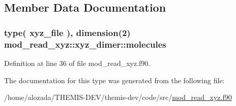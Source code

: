 \subsection{Member Data Documentation}
\subsubsection[{\texorpdfstring{molecules}{molecules}}]{\setlength{\rightskip}{0pt plus 5cm}type( {\bf xyz\+\_\+file} ), dimension(2) mod\+\_\+read\+\_\+xyz\+::xyz\+\_\+dimer\+::molecules}\hypertarget{structmod__read__xyz_1_1xyz__dimer_af7e03e5b57bc4a39e4905ff0aecbf6b6}{}\label{structmod__read__xyz_1_1xyz__dimer_af7e03e5b57bc4a39e4905ff0aecbf6b6}


Definition at line 36 of file mod\+\_\+read\+\_\+xyz.\+f90.



The documentation for this type was generated from the following file\+:\begin{DoxyCompactItemize}
\item 
/home/alozada/\+T\+H\+E\+M\+I\+S-\/\+D\+E\+V/themis-\/dev/code/src/\hyperlink{mod__read__xyz_8f90}{mod\+\_\+read\+\_\+xyz.\+f90}\end{DoxyCompactItemize}
